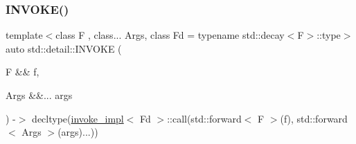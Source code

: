 \subsubsection{\texorpdfstring{I\+N\+V\+O\+K\+E()}{INVOKE()}}
{\footnotesize\ttfamily template$<$class F , class... Args, class Fd  = typename std\+::decay$<$\+F$>$\+::type$>$ \\
auto std\+::detail\+::\+I\+N\+V\+O\+KE (\begin{DoxyParamCaption}\item[{F \&\&}]{f,  }\item[{Args \&\&...}]{args }\end{DoxyParamCaption}) -\/$>$  decltype(\hyperlink{structstd_1_1detail_1_1invoke__impl}{invoke\+\_\+impl}$<$ Fd $>$\+::call(std\+::forward$<$ F $>$(f), std\+::forward$<$ Args $>$(args)...))}


